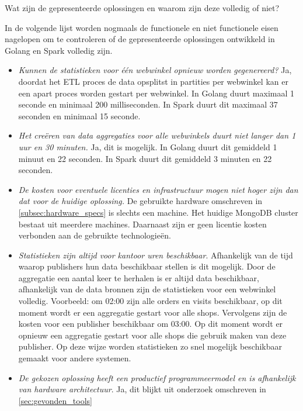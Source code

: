 Wat zijn de gepresenteerde oplossingen en waarom zijn deze volledig of niet?

In de volgende lijst worden nogmaals de functionele en niet functionele eisen nagelopen om te controleren of de gepresenteerde oplossingen ontwikkeld in Golang en Spark volledig zijn.

\begin{itemize}
    \item \textit{Kunnen de statistieken voor één webwinkel opnieuw worden gegenereerd?} Ja, doordat het ETL proces de data opsplitst in partities per webwinkel kan er een apart proces worden gestart per webwinkel. In Golang duurt maximaal 1 seconde en minimaal 200 milliseconden. In Spark duurt dit maximaal 37 seconden en minimaal 15 seconde.
    
    \item \textit{ Het creëren van data aggregaties voor alle webwinkels duurt niet langer dan 1 uur en 30 minuten.} Ja, dit is mogelijk. In Golang duurt dit gemiddeld 1 minuut en 22 seconden. In Spark duurt dit gemiddeld 3 minuten en 22 seconden.
    
    \item \textit{De kosten voor eventuele licenties en infrastructuur mogen niet hoger zijn dan dat voor de huidige oplossing.} De gebruikte hardware omschreven in \ref{subsec:hardware_specs} is slechts een machine. Het huidige MongoDB cluster bestaat uit meerdere machines. Daarnaast zijn er geen licentie kosten verbonden aan de gebruikte technologieën.
    
    \item \textit{Statistieken zijn altijd voor kantoor uren beschikbaar}. Afhankelijk van de tijd waarop publishers hun data beschikbaar stellen is dit mogelijk. Door de aggregatie een aantal keer te herhalen is er altijd data beschikbaar, afhankelijk van de data bronnen zijn de statistieken voor een webwinkel volledig. Voorbeeld: om 02:00 zijn alle orders en visits beschikbaar, op dit moment wordt er een aggregatie gestart voor alle shops. Vervolgens zijn de kosten voor een publisher beschikbaar om 03:00. Op dit moment wordt er opnieuw een aggregatie gestart voor alle shops die gebruik maken van deze publisher. Op deze wijze worden statistieken zo snel mogelijk beschikbaar gemaakt voor andere systemen.
    
    \item \textit{De gekozen oplossing heeft een productief programmeermodel en is afhankelijk van hardware architectuur}. Ja, dit blijkt uit onderzoek omschreven in  \ref{sec:gevonden_tools}
    

\end{itemize}
